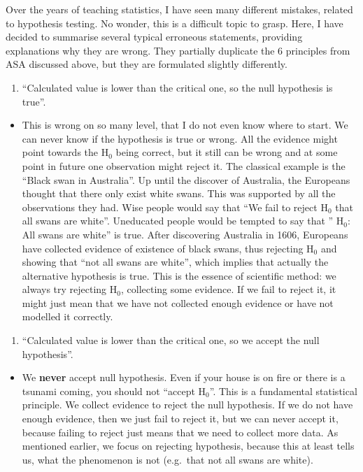 \documentclass[
]{book}
\providecommand{\tightlist}{%
  \setlength{\itemsep}{0pt}\setlength{\parskip}{0pt}}
\theoremstyle{definition}
\theoremstyle{definition}
\theoremstyle{definition}
\theoremstyle{definition}
\theoremstyle{remark}
\begin{document}
Over the years of teaching statistics, I have seen many different mistakes, related to hypothesis testing. No wonder, this is a difficult topic to grasp. Here, I have decided to summarise several typical erroneous statements, providing explanations why they are wrong. They partially duplicate the 6 principles from ASA discussed above, but they are formulated slightly differently.

\begin{enumerate}
\def\labelenumi{\arabic{enumi}.}
\tightlist
\item
  ``Calculated value is lower than the critical one, so the null hypothesis is true''.
\end{enumerate}

\begin{itemize}
\tightlist
\item
  This is wrong on so many level, that I do not even know where to start. We can never know if the hypothesis is true or wrong. All the evidence might point towards the \(\mathrm{H}_0\) being correct, but it still can be wrong and at some point in future one observation might reject it. The classical example is the ``Black swan in Australia''. Up until the discover of Australia, the Europeans thought that there only exist white swans. This was supported by all the observations they had. Wise people would say that ``We fail to reject \(\mathrm{H}_0\) that all swans are white''. Uneducated people would be tempted to say that '' \(\mathrm{H}_0\): All swans are white'' is true. After discovering Australia in 1606, Europeans have collected evidence of existence of black swans, thus rejecting \(\mathrm{H}_0\) and showing that ``not all swans are white'', which implies that actually the alternative hypothesis is true. This is the essence of scientific method: we always try rejecting \(\mathrm{H}_0\), collecting some evidence. If we fail to reject it, it might just mean that we have not collected enough evidence or have not modelled it correctly.
\end{itemize}

\begin{enumerate}
\def\labelenumi{\arabic{enumi}.}
\setcounter{enumi}{1}
\tightlist
\item
  ``Calculated value is lower than the critical one, so we accept the null hypothesis''.
\end{enumerate}

\begin{itemize}
\tightlist
\item
  We \textbf{never} accept null hypothesis. Even if your house is on fire or there is a tsunami coming, you should not ``accept \(\mathrm{H}_0\)''. This is a fundamental statistical principle. We collect evidence to reject the null hypothesis. If we do not have enough evidence, then we just fail to reject it, but we can never accept it, because failing to reject just means that we need to collect more data. As mentioned earlier, we focus on rejecting hypothesis, because this at least tells us, what the phenomenon is not (e.g.~that not all swans are white).
\end{itemize}
\end{document}
